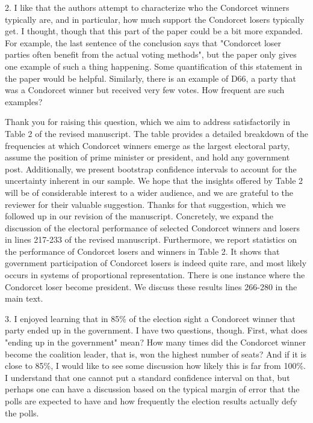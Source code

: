 \documentclass[a4paper, 12pt]{scrartcl}
\theoremstyle{break}
\newenvironment{changes}{\par\color{violet}\par\addvspace{\baselineskip}}{\par\addvspace{\baselineskip}}
\begin{document}
\begin{changes}
	2. I like that the authors attempt to characterize who the Condorcet winners typically are, and in particular, how much support the Condorcet losers typically get. I thought, though that this part of the paper could be a bit more expanded. For example, the last sentence of the conclusion says that "Condorcet loser parties often benefit from the actual voting methods", but the paper only gives one example of such a thing happening. Some quantification of this statement in the paper would be helpful. Similarly, there is an example of D66, a party that was a Condorcet winner but received very few votes. How frequent are such examples?
\end{changes}
Thank you for raising this question, which we aim to address satisfactorily in Table 2 of the revised manuscript. The table provides a detailed breakdown of the frequencies at which Condorcet winners emerge as the largest electoral party, assume the position of prime minister or president, and hold any government post. Additionally, we present bootstrap confidence intervals to account for the uncertainty inherent in our sample. We hope that the insights offered by Table 2 will be of considerable interest to a wider audience, and we are grateful to the reviewer for their valuable suggestion.
Thanks for that suggestion, which we followed up in our revision of the manuscript. Concretely, we expand the discussion of the electoral performance of selected Condorcet winners and losers in lines 217-233 of the revised manuscript.  Furthermore, we report statistics on the performance of Condorcet losers and winners in Table 2. It shows that government participation of Condorcet losers is indeed quite rare, and most likely occurs in systems of proportional representation. There is one instance where the Condorcet loser become president. We discuss these results lines 266-280 in the main text.

\begin{changes}
	3. I enjoyed learning that in 85\% of the election sight a Condorcet winner that party ended up in the government. I have two questions, though. First, what does "ending up in the government" mean? How many times did the Condorcet winner become the coalition leader, that is, won the highest number of seats? And if it is close to 85\%, I would like to see some discussion how likely this is far from 100\%. I understand that one cannot put a standard confidence interval on that, but perhaps one can have a discussion based on the typical margin of error that the polls are expected to have and how frequently the election results actually defy the polls. 
\end{changes}
\end{document}
